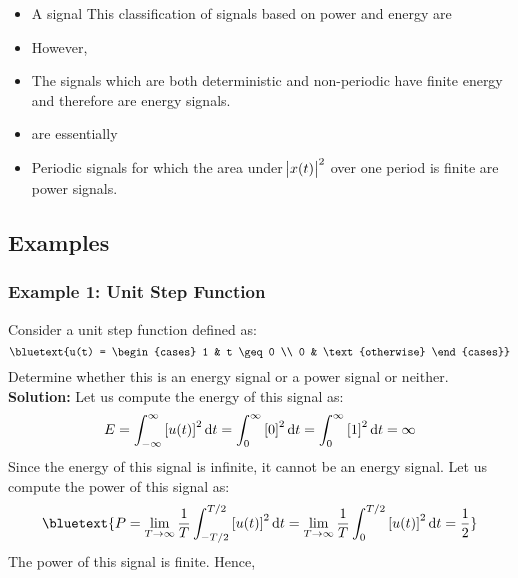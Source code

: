 \documentclass[../notes-main.tex]{subfiles}
\begin{document}
\begin{mdframed}
    \begin{center}
        \begin{itemize}
            \item[\bluetext{a.}] A signal  This classification of signals based on power and energy are 
            \item[\bluetext{b.}] However, 
            \item[\bluetext{c.}] The signals which are both deterministic and non-periodic have finite energy and therefore are energy signals.\,
            \item[\bluetext{d.}]  are essentially 
            \item[\bluetext{e.}] Periodic signals for which the area under \(\abs{x(t)}^2\) over one period is finite are power signals.
        \end{itemize}
    \end{center}
\end{mdframed}\label{fig:energy-power-relationship-itemize}
\subsection{Examples}
\subsubsection{Example 1: Unit Step Function}
Consider a unit step function defined as:
\begin{equation}
    \bluetext{u(t) =
        \begin{cases}
            1 & t \geq 0         \\
            0 & \text{otherwise}
        \end{cases}}
    \label{eq:unit-step-function-example}
\end{equation}
Determine whether this is an energy signal or a power signal or neither.\\
\noindent \textbf{Solution:} Let us compute the energy of this signal as:
\begin{equation}
    E = \int_{-\infty}^{\infty} {[u(t)]}^2 \dif t = \int_{0}^{\infty} {[0]}^2 \dif t = \int_{0}^{\infty} {[1]}^2 \dif t = \infty
    \label{eq:unit-step-energy}
\end{equation}
Since the energy of this signal is infinite, it cannot be an energy signal. Let us compute the power of this signal as:
\begin{equation}
    \bluetext{P = \lim_{T \to \infty} \frac{1}{T} \int_{-T/2}^{T/2} {[u(t)]}^2 \dif t = \lim_{T \to \infty} \frac{1}{T} \int_{0}^{T/2} {[u(t)]}^2 \dif t = \frac{1}{2}}
    \label{eq:unit-step-power}
\end{equation}
The power of this signal is finite. Hence,\,
\end{document}

